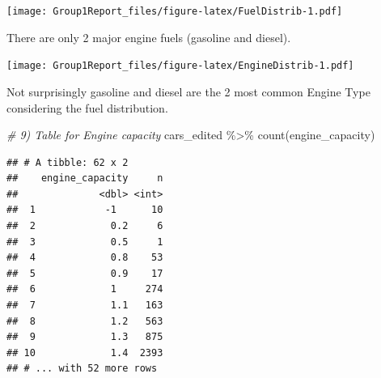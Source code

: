 \documentclass[
]{article}
\newenvironment{Shaded}{\begin{snugshade}}{\end{snugshade}}
\newcommand{\AttributeTok}[1]{\textcolor[rgb]{0.77,0.63,0.00}{#1}}
\newcommand{\CommentTok}[1]{\textcolor[rgb]{0.56,0.35,0.01}{\textit{#1}}}
\newcommand{\DecValTok}[1]{\textcolor[rgb]{0.00,0.00,0.81}{#1}}
\newcommand{\FloatTok}[1]{\textcolor[rgb]{0.00,0.00,0.81}{#1}}
\newcommand{\FunctionTok}[1]{\textcolor[rgb]{0.00,0.00,0.00}{#1}}
\newcommand{\NormalTok}[1]{#1}
\newcommand{\OtherTok}[1]{\textcolor[rgb]{0.56,0.35,0.01}{#1}}
\newcommand{\SpecialCharTok}[1]{\textcolor[rgb]{0.00,0.00,0.00}{#1}}
\newcommand{\StringTok}[1]{\textcolor[rgb]{0.31,0.60,0.02}{#1}}
\begin{document}
\texttt{[image: Group1Report\_files/figure-latex/FuelDistrib-1.pdf]}

There are only 2 major engine fuels (gasoline and diesel).

\begin{Shaded}
\end{Shaded}

\texttt{[image: Group1Report\_files/figure-latex/EngineDistrib-1.pdf]}

Not surprisingly gasoline and diesel are the 2 most common Engine Type
considering the fuel distribution.

\begin{Shaded}
\begin{Highlighting}[]
\CommentTok{\# 9) Table for Engine capacity}
\NormalTok{cars\_edited }\SpecialCharTok{\%\textgreater{}\%} \FunctionTok{count}\NormalTok{(engine\_capacity)}
\end{Highlighting}
\end{Shaded}

\begin{verbatim}
## # A tibble: 62 x 2
##    engine_capacity     n
##              <dbl> <int>
##  1            -1      10
##  2             0.2     6
##  3             0.5     1
##  4             0.8    53
##  5             0.9    17
##  6             1     274
##  7             1.1   163
##  8             1.2   563
##  9             1.3   875
## 10             1.4  2393
## # ... with 52 more rows
\end{verbatim}
\end{document}
